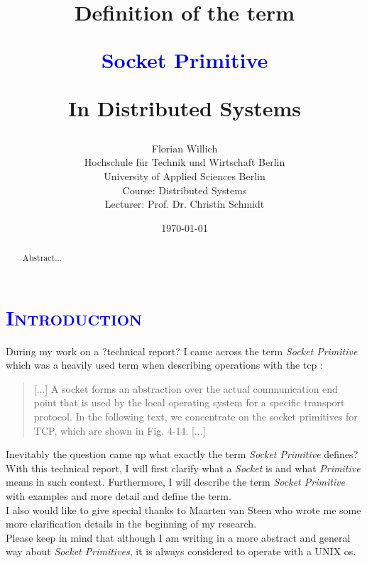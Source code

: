 \documentclass[xcolor=dvipsnames]{article}
\title{\scshape{
\begin{small}
Definition of the term\\
\end{small} 
\textbf{\textcolor{blue}{Socket Primitive}}\\
\begin{small}
In Distributed Systems
\end{small}
}}
\author{Florian Willich \\ Hochschule f\"ur Technik und Wirtschaft Berlin \\ University of Applied Sciences Berlin \\ Course: Distributed Systems \\ Lecturer: Prof. Dr. Christin Schmidt}
\date{\today}
\begin{document}

\begin{titlepage}

\maketitle

\begin{abstract}
Abstract...
\end{abstract}

\end{titlepage}

\newpage

\tableofcontents

\newpage


\section{\scshape{\textcolor{blue}{Introduction}}} \label{introduction}

During my work on a ?technical report? I came across the term \textit{Socket Primitive} which was a heavily used term when describing operations with the \gls{tcp} \cite[p. 141, ch. 4.3.1]{tanenbaum}:

\begin{quote}
[...] A socket forms an abstraction over the actual communication end
point that is used by the local operating system for a specific
transport protocol. In the following text, we concentrate on the socket
primitives for TCP, which are shown in Fig. 4-14. [...] 
\end{quote}

\noindent Inevitably the question came up what exactly the term \textit{Socket Primitive} defines?  With this technical report, I will first clarify what a \textit{Socket} is and what \textit{Primitive} means in such context. Furthermore, I will describe the term \textit{Socket Primitive} with examples and more detail and define the term.\\

\noindent I also would like to give special thanks to Maarten van Steen who wrote me some more clarification details in the beginning of my research.\\

\noindent Please keep in mind that although I am writing in a more abstract and general way about \textit{Socket Primitives}, it is always considered to operate with a UNIX \gls{os}.
\end{document}
